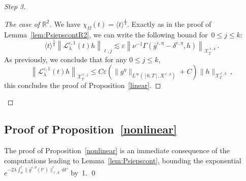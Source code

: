 \documentclass[11pt]{article}
\theoremstyle{definition}
\numberwithin{equation}{section}
\numberwithin{figure}{section}
\numberwithin{table}{section}
\newcommand*{\dd}{\mathrm{d}}
\newcommand*{\dt}{\dd t}
\newenvironment{step}[1]{\begin{proof}[#1]}{\let\qed\relax\end{proof}}
\newenvironment{laststep}[1]{\begin{proof}[#1]}{\end{proof}}
\newcommand*\R {\mathbb{R}}
\newcommand*\eps{{\varepsilon}}
\newcommand*\e{{\varepsilon}}
\begin{document}
\begin{step}{Step 3}
\begin{laststep}{The case of $\R^2$}
We have $\chi_\Omega(t) = \langle t \rangle^{\frac14} $. Exactly as in the proof of Lemma~\ref{lem:PsiepscontR2}, we can write the following bound for~$0\leq j \leq k$:
\[
\langle t \rangle^{\frac14} \left\|\mathcal{L}_\lambda^{\e,1}(t)h\right\|_{{\ell,j}}
\lesssim \e \left\| \nu^{-1} \Gamma (\overline g^{\eps,\eta}-\delta^{\eps,\eta},h) \right\|_{\mathcal{X}_T^{\ell,k} }\,.
\]
As previously, we conclude that for any $0 \le j \le k$,
\[
\left\| \mathcal{L}_\lambda^{\e,1}(t)h \right\|_{\mathcal{X}_T^{\ell,j} } \le C\e \left(\|{g^\eta} \|_{L^\infty([0,T], X^{\ell,k})} +C\right) \|h\|_{\mathcal{X}_T^{\ell,k} }\,,
\]
this concludes the proof of Proposition~\ref{linear}.
\end{laststep}
\end{step}

\subsection{Proof of Proposition~\ref{nonlinear}}
The proof of Proposition~\ref{nonlinear} is an immediate consequence of the computations leading to Lemma~\ref{lem:Psiepscont}, bounding the exponential~$e^{-2\lambda \int_0^t \|\overline g^{\eps,\eta}(t')\|_{\ell,k}^r\, \dt' } $ by~1.
\qed
\end{document}
